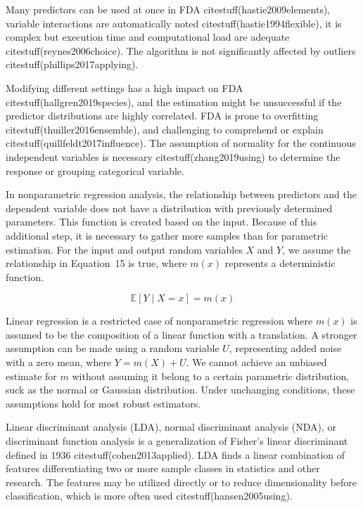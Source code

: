 \documentclass[preprint,12pt]{elsarticle}
\begin{document}
Many predictors can be used at once in FDA citestuff(hastie2009elements), variable interactions are automatically noted citestuff(hastie1994flexible), it is complex but execution time and computational load are adequate citestuff(reynes2006choice). The algorithm is not significantly affected by outliers citestuff(phillips2017applying).

Modifying different settings has a high impact on FDA citestuff(hallgren2019species), and the estimation might be unsuccessful if the predictor distributions are highly correlated. FDA is prone to overfitting citestuff(thuiller2016ensemble), and challenging to comprehend or explain citestuff(quillfeldt2017influence). The assumption of normality for the continuous independent variables is necessary citestuff(zhang2019using) to determine the response or grouping categorical variable. 

In nonparametric regression analysis, the relationship between predictors and the dependent variable does not have a distribution with previously determined parameters. This function is created based on the input. Because of this additional step, it is necessary to gather more samples than for parametric estimation. For the input and output random variables $X$ and $Y$, we assume the relationship in Equation~15 is true, where $m\left(x\right)$ represents a deterministic function.

\begin{equation}
	\mathbb{E}[Y\mid X=x]=m\left(x\right)
	\label{eqn:15}
\end{equation}

Linear regression is a restricted case of nonparametric regression where $m\left(x\right)$ is assumed to be the composition of a linear function with a translation. A stronger assumption can be made using a random variable $U$, representing added noise with a zero mean, where $Y=m\left(X\right)+U$. We cannot achieve an unbiased estimate for $m$ without assuming it belong to a certain parametric distribution, suck as the normal or Gaussian distribution. Under unchanging conditions, these assumptions hold for most robust estimators.

Linear discriminant analysis (LDA), normal discriminant analysis (NDA), or discriminant function analysis is a generalization of Fisher's linear discriminant defined in 1936 citestuff(cohen2013applied). LDA finds a linear combination of features differentiating two or more sample classes in statistics and other research. The features may be utilized directly or to reduce dimensionality before classification, which is more often used citestuff(hansen2005using).
\end{document}
